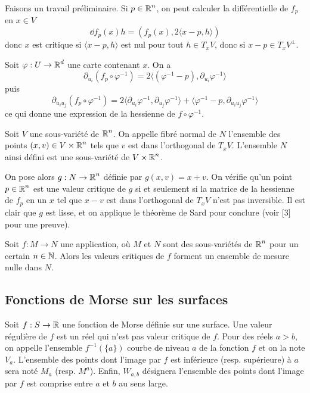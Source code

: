 Faisons un travail préliminaire. Si $p\in\operatorname{\mathbb R}^n$, on peut calculer la différentielle de $f_p$ en 
$x\in V$
\[
    \dd f_p(x)h=(f_p(x),2\langle x-p,h\rangle)
\]
donc $x$ est critique si $\langle x-p,h\rangle$ est nul pour tout $h\in T_xV$, donc si 
$x-p\in T_xV^\bot$.

Soit $\varphi:U\to \operatorname{\mathbb R}^d$ une carte contenant $x$. On a 
\[
    \partial_{u_i}(f_p\circ\varphi^{-1})=
    2\langle (\varphi^{-1}-p),\partial_{u_i}\varphi^{-1}\rangle
\]
puis
\[
    \partial_{u_iu_j}(f_p\circ\varphi^{-1})=
    2\langle\partial_{u_i}\varphi^{-1},\partial_{u_j}\varphi^{-1}\rangle
    +\langle\varphi^{-1}-p,\partial_{u_iu_j}\varphi^{-1}\rangle\tag*{(1)}
\]
ce qui donne une expression de la hessienne de $f\circ\varphi^{-1}$. 

\begin{defi}
    Soit $V$ une sous-variété de $\operatorname{\mathbb R}^n$. 
    On appelle fibré normal de $N$ l'ensemble des points $(x,v)\in V\times\operatorname{\mathbb R}^n$ tels que $v$ 
    est dans l'orthogonal de $T_xV$. 
    L'ensemble $N$ ainsi défini est une sous-variété de $V\times\operatorname{\mathbb R}^n$.
\end{defi}

On pose alors $g:N\to\operatorname{\mathbb R}^n$ définie par $g(x,v)=x+v$. 
On vérifie qu'un point $p\in\operatorname{\mathbb R}^n$ est une valeur critique de $g$ si et seulement si 
la matrice de la hessienne de $f_p$ en un $x$ tel que $x-v$ est dans l'orthogonal de 
$T_xV$ n'est pas inversible.
Il est clair que $g$ est lisse, et on applique le théorème de Sard pour conclure (voir [3]
pour une preuve).

\begin{thm}[de Sard]
    Soit $f:M\to N$ une application, où $M$ et $N$ sont des sous-variétés de 
    $\operatorname{\mathbb R}^n$ pour un certain $n\in\operatorname{\mathbb N}$.
    Alors les valeurs critiques de $f$ forment un ensemble de mesure nulle dans $N$.
\end{thm}

\subsection{Fonctions de Morse sur les surfaces}

Soit $f:S\to\operatorname{\mathbb R}$ une fonction de Morse définie sur une surface. 
Une valeur régulière de $f$ est un réel qui n'est pas valeur critique de $f$. 
Pour des réels $a>b$, on appelle l'ensemble $f^{-1}(\lbrace a \rbrace)$ courbe de niveau 
$a$ de la fonction $f$ et on la note $V_a$. 
L'ensemble des points dont l'image par $f$ est inférieure (resp. supérieure) à $a$ sera noté $M_a$
(resp. $M^a$). 
Enfin, $W_{a,b}$ désignera l'ensemble des points dont l'image par $f$ est comprise entre 
$a$ et $b$ au sens large. 

